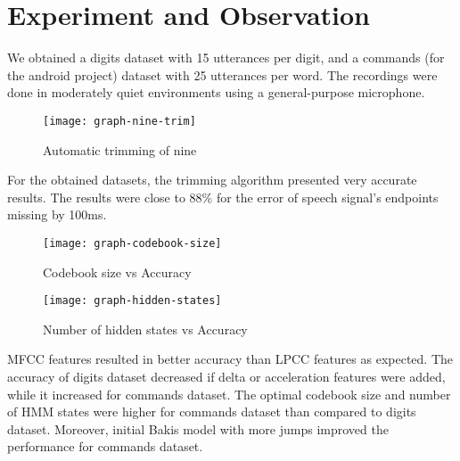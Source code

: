 \chapter{Experiment and Observation} \label{ch:experiment}

We obtained a digits dataset with 15 utterances per digit, and a commands (for the android project) dataset with 25 utterances per word. The recordings were done in moderately quiet environments using a general-purpose microphone.

\begin{figure}
    \centering
    \texttt{[image: graph-nine-trim]}
    \label{fig:graph-nine-trim}
    \caption{Automatic trimming of nine}
\end{figure}

For the obtained datasets, the trimming algorithm presented very accurate results. The results were close to 88\% for the error of speech signal's endpoints missing by 100ms.

\newpage

\begin{figure}
    \centering
    \texttt{[image: graph-codebook-size]}
    \label{fig:graph-codebook-size}
    \caption{Codebook size vs Accuracy}
\end{figure}

\begin{figure}
    \centering
    \texttt{[image: graph-hidden-states]}
    \label{fig:graph-hidden-states}
    \caption{Number of hidden states vs Accuracy}
\end{figure}

MFCC features resulted in better accuracy than LPCC features as expected. The accuracy of digits dataset decreased if delta or acceleration features were added, while it increased for commands dataset. The optimal codebook size and number of HMM states were higher for commands dataset than compared to digits dataset. Moreover, initial Bakis model with more jumps improved the performance for commands dataset.

\hfill

